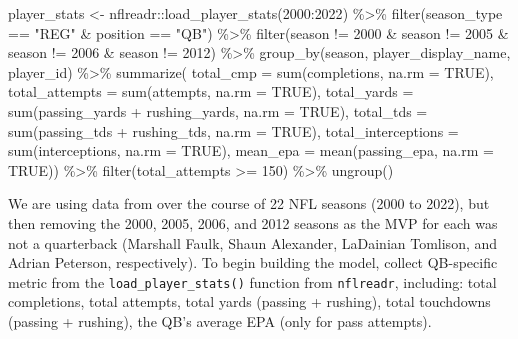 \documentclass[
  letterpaper,
]{krantz}
\newenvironment{Shaded}{\begin{snugshade}}{\end{snugshade}}
\newcommand{\AttributeTok}[1]{\textcolor[rgb]{0.40,0.45,0.13}{#1}}
\newcommand{\ConstantTok}[1]{\textcolor[rgb]{0.56,0.35,0.01}{#1}}
\newcommand{\DecValTok}[1]{\textcolor[rgb]{0.68,0.00,0.00}{#1}}
\newcommand{\FunctionTok}[1]{\textcolor[rgb]{0.28,0.35,0.67}{#1}}
\newcommand{\NormalTok}[1]{\textcolor[rgb]{0.00,0.23,0.31}{#1}}
\newcommand{\OtherTok}[1]{\textcolor[rgb]{0.00,0.23,0.31}{#1}}
\newcommand{\SpecialCharTok}[1]{\textcolor[rgb]{0.37,0.37,0.37}{#1}}
\newcommand{\StringTok}[1]{\textcolor[rgb]{0.13,0.47,0.30}{#1}}
\begin{document}
\begin{Shaded}
\begin{Highlighting}[]
\NormalTok{player\_stats }\OtherTok{\textless{}{-}}\NormalTok{ nflreadr}\SpecialCharTok{::}\FunctionTok{load\_player\_stats}\NormalTok{(}\DecValTok{2000}\SpecialCharTok{:}\DecValTok{2022}\NormalTok{) }\SpecialCharTok{\%\textgreater{}\%}
  \FunctionTok{filter}\NormalTok{(season\_type }\SpecialCharTok{==} \StringTok{"REG"} \SpecialCharTok{\&}\NormalTok{ position }\SpecialCharTok{==} \StringTok{"QB"}\NormalTok{) }\SpecialCharTok{\%\textgreater{}\%}
  \FunctionTok{filter}\NormalTok{(season }\SpecialCharTok{!=} \DecValTok{2000} \SpecialCharTok{\&}\NormalTok{ season }\SpecialCharTok{!=} \DecValTok{2005} \SpecialCharTok{\&}\NormalTok{ season }\SpecialCharTok{!=} \DecValTok{2006} \SpecialCharTok{\&}\NormalTok{ season }\SpecialCharTok{!=} \DecValTok{2012}\NormalTok{) }\SpecialCharTok{\%\textgreater{}\%}
  \FunctionTok{group\_by}\NormalTok{(season, player\_display\_name, player\_id) }\SpecialCharTok{\%\textgreater{}\%}
  \FunctionTok{summarize}\NormalTok{(}
    \AttributeTok{total\_cmp =} \FunctionTok{sum}\NormalTok{(completions, }\AttributeTok{na.rm =} \ConstantTok{TRUE}\NormalTok{),}
    \AttributeTok{total\_attempts =} \FunctionTok{sum}\NormalTok{(attempts, }\AttributeTok{na.rm =} \ConstantTok{TRUE}\NormalTok{),}
    \AttributeTok{total\_yards =} \FunctionTok{sum}\NormalTok{(passing\_yards }\SpecialCharTok{+}\NormalTok{ rushing\_yards, }\AttributeTok{na.rm =} \ConstantTok{TRUE}\NormalTok{),}
    \AttributeTok{total\_tds =} \FunctionTok{sum}\NormalTok{(passing\_tds }\SpecialCharTok{+}\NormalTok{ rushing\_tds, }\AttributeTok{na.rm =} \ConstantTok{TRUE}\NormalTok{),}
    \AttributeTok{total\_interceptions =} \FunctionTok{sum}\NormalTok{(interceptions, }\AttributeTok{na.rm =} \ConstantTok{TRUE}\NormalTok{),}
    \AttributeTok{mean\_epa =} \FunctionTok{mean}\NormalTok{(passing\_epa, }\AttributeTok{na.rm =} \ConstantTok{TRUE}\NormalTok{)) }\SpecialCharTok{\%\textgreater{}\%}
  \FunctionTok{filter}\NormalTok{(total\_attempts }\SpecialCharTok{\textgreater{}=} \DecValTok{150}\NormalTok{) }\SpecialCharTok{\%\textgreater{}\%}
  \FunctionTok{ungroup}\NormalTok{()}
\end{Highlighting}
\end{Shaded}

We are using data from over the course of 22 NFL seasons (2000 to 2022),
but then removing the 2000, 2005, 2006, and 2012 seasons as the MVP for
each was not a quarterback (Marshall Faulk, Shaun Alexander, LaDainian
Tomlison, and Adrian Peterson, respectively). To begin building the
model, collect QB-specific metric from the
\texttt{load\_player\_stats()} function from \texttt{nflreadr},
including: total completions, total attempts, total yards (passing +
rushing), total touchdowns (passing + rushing), the QB's average EPA
(only for pass attempts).
\end{document}
